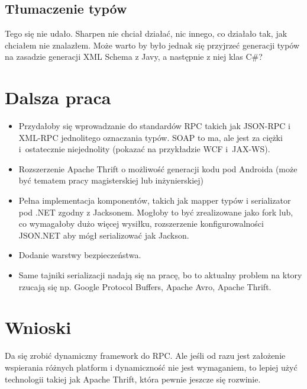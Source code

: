 \subsection{Tłumaczenie typów}
Tego się nie udało. Sharpen nie chciał działać, nic innego, co działało tak, jak chciałem nie znalazłem. Może warto by było jednak się przyjrzeć generacji typów na zasadzie generacji XML Schema z Javy, a następnie z niej klas C\#?



\section{Dalsza praca}
\begin{itemize}
	\item Przydałoby się wprowadzanie do standardów RPC takich jak JSON-RPC i XML-RPC jednolitego oznaczania typów. SOAP to ma, ale jest za ciężki i~ostatecznie niejednolity (pokazać na przykładzie WCF i~JAX-WS).
	\item Rozszerzenie Apache Thrift o możliwość generacji kodu pod Androida (może być tematem pracy magisterskiej lub inżynierskiej)
	\item Pełna implementacja komponentów, takich jak mapper typów i serializator pod .NET zgodny z Jacksonem. Mogłoby to być zrealizowane jako fork lub, co wymagałoby dużo więcej wysiłku, rozszerzenie konfigurowalności JSON.NET aby mógł serializować jak Jackson.
	\item Dodanie warstwy bezpieczeństwa.
	\item Same tajniki serializacji nadają się na pracę, bo to aktualny problem na ktory rzucają się np. Google Protocol Buffers, Apache Avro, Apache Thrift.
\end{itemize}




\section{Wnioski}
Da się zrobić dynamiczny framework do RPC. Ale jeśli od razu jest założenie wspierania różnych platform i dynamiczność nie jest wymaganiem, to lepiej użyć technologii takiej jak Apache Thrift, która pewnie jeszcze się rozwinie.